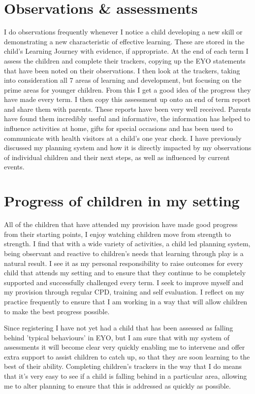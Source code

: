 \documentclass[10pt,a4paper]{report}
\begin{document}
\section{Observations \& assessments}

I do observations frequently whenever I notice a child developing a new skill or demonstrating a new characteristic of effective learning. These are stored in the child's Learning Journey with evidence, if appropriate. At the end of each term I assess the children and complete their trackers, copying up the EYO statements that have been noted on their observations. I then look at the trackers, taking into consideration all 7 areas of learning and development, but focusing on the prime areas for younger children. From this I get a good idea of the progress they have made every term. I then copy this assessment up onto an end of term report and share them with parents. These reports have been very well received. Parents have found them incredibly useful and informative, the information has helped to influence activities at home, gifts for special occasions and has been used to communicate with health visitors at a child's one year check. I have previously discussed my planning system and how it is directly impacted by my observations of individual children and their next steps, as well as influenced by current events.

\section{Progress of children in my setting}

All of the children that have attended my provision have made good progress from their starting points, I enjoy watching children move from strength to strength. I find that with a wide variety of activities, a child led planning system, being observant and reactive to children's needs that learning through play is a natural result. I see it as my personal responsibility to raise outcomes for every child that attends my setting and to ensure that they continue to be completely supported and successfully challenged every term. I seek to improve myself and my provision through regular CPD, training and self evaluation. I reflect on my practice frequently to ensure that I am working in a way that will allow children to make the best progress possible. 

Since registering I have not yet had a child that has been assessed as falling behind 'typical behaviours' in EYO, but I am sure that with my system of assessments it will become clear very quickly enabling me to intervene and offer extra support to assist children to catch up, so that they are soon learning to the best of their ability. Completing children's trackers in the way that I do means that it's very easy to see if a child is falling behind in a particular area, allowing me to alter planning to ensure that this is addressed as quickly as possible.
\end{document}
